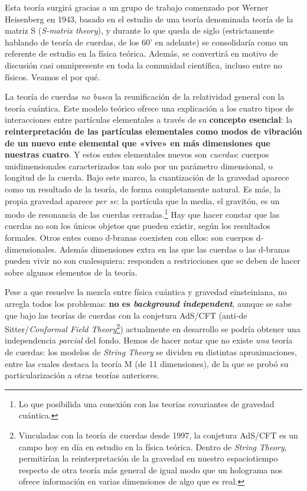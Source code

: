 \documentclass[11pt,a4paper,titlepage]{article}
\begin{document}
Esta teoría surgirá gracias a un grupo de trabajo comenzado por Werner Heisenberg en 1943, basado en el estudio de una teoría denominada teoría de la matriz S (\textit{S-matrix theory}), y durante lo que queda de siglo (estrictamente hablando de teoría de cuerdas, de los 60' en adelante) se consolidaría como un referente de estudio en la física teórica. Además, se convertirá en motivo de discusión casi omnipresente en toda la comunidad científica, incluso entre no físicos. Veamos el por qué.

La teoría de cuerdas \textit{no busca} la reunificación de la relatividad general con la teoría cuántica. Este modelo teórico ofrece una explicación a los cuatro tipos de interacciones entre partículas elementales a través de su \textbf{concepto esencial}: la \textbf{reinterpretación de las partículas elementales como modos de vibración de un nuevo ente elemental que «vive» en más dimensiones que nuestras cuatro}. Y estos entes elementales nuevos son \textit{cuerdas}: cuerpos unidimensionales caracterizados tan solo por un parámetro dimensional, o longitud de la cuerda. Bajo este marco, la cuantización de la gravedad aparece como un resultado de la teoría, de forma completamente natural. Es más, la propia gravedad aparece \textit{per se}: la partícula que la media, el gravitón, es un modo de resonancia de las cuerdas cerradas.\footnote{Lo que posibilida una conexión con las teorías covariantes de gravedad cuántica.} Hay que hacer constar que las cuerdas no son los únicos objetos que pueden existir, según los resultados formales. Otros entes como d-branas coexisten con ellos: son cuerpos d-dimensionales. Además dimensiones extra en las que las cuerdas o las d-branas pueden vivir no son cualesquiera: responden a restricciones que se deben de hacer sobre algunos elementos de la teoría.

Pese a que resuelve la mezcla entre física cuántica y gravedad einsteiniana, no arregla todos los problemas: \textbf{no es \textit{background independent}}, aunque se sabe que bajo las teorías de cuerdas con la conjetura AdS/CFT (anti-de Sitter/\textit{Conformal Field Theory}\footnote{Vinculadas con la teoría de cuerdas desde 1997, la conjetura AdS/CFT es un campo hoy en día en estudio en la física teórica. Dentro de \textit{String Theory}, permitirían la reinterpretación de la gravedad en nuestro espaciotiempo respecto de otra teoría más general de igual modo que un holograma nos ofrece información en varias dimensiones de algo que es real.}) actualmente en desarrollo se podría obtener una independencia \textit{parcial} del fondo. Hemos de hacer notar que no existe \textit{una} teoría de cuerdas: los modelos de \textit{String Theory} se dividen en distintas aproximaciones, entre las cuales destaca la teoría M (de 11 dimensiones), de la que se probó su particularización a otras teorías anteriores.
\end{document}
